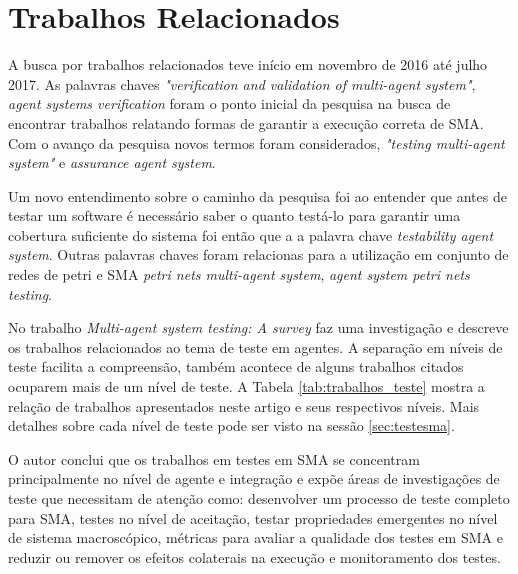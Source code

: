 \chapter{Trabalhos Relacionados}

A busca por trabalhos relacionados teve início em novembro de 2016 até julho 2017. As palavras chaves \textit{"verification and validation of multi-agent system"}, \textit{agent systems verification} foram o ponto inicial da pesquisa na busca de encontrar trabalhos relatando formas de garantir a execução correta de SMA. Com o avanço da pesquisa novos termos foram considerados,  \textit{"testing multi-agent system"} e \textit{assurance agent system}. 

Um novo entendimento sobre o caminho da pesquisa foi ao entender que antes de testar um software é necessário saber o quanto testá-lo para garantir uma cobertura suficiente do sistema foi então que a a palavra chave \textit{testability agent system}. Outras palavras chaves foram relacionas para a utilização em conjunto de redes de petri e SMA \textit{petri nets multi-agent system}, \textit{agent system petri nets testing}.

No trabalho \textit{Multi-agent system testing: A survey} \citet{houhamdi2011multi} faz uma investigação e descreve os trabalhos relacionados ao tema de teste em agentes. A separação em níveis de teste facilita a compreensão, também acontece de alguns trabalhos citados ocuparem mais de um nível de teste. A Tabela \ref{tab:trabalhos_teste} mostra a relação de trabalhos apresentados neste artigo e seus respectivos níveis. Mais detalhes sobre cada nível de teste pode ser visto na sessão \ref{sec:testesma}.

O autor conclui que os trabalhos em testes em SMA se concentram principalmente no nível de agente e integração e expõe áreas de investigações de teste que necessitam de atenção como: desenvolver um processo de teste completo para SMA, testes no nível de aceitação, testar propriedades emergentes no nível de sistema macroscópico, métricas para avaliar a qualidade dos testes em SMA e reduzir ou remover os efeitos colaterais na execução e monitoramento dos testes.

